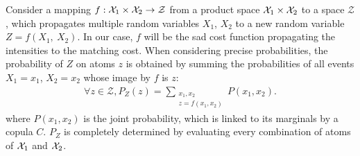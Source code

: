 Consider a mapping $f:\mathcal{X}_1\times\mathcal{X}_2\rightarrow\mathcal{Z}$ from a product space $\mathcal{X}_1\times\mathcal{X}_2$ to a space $\mathcal{Z}$, which propagates multiple random variables $X_1$, $X_2$ to a new random variable $Z=f(X_1, ~X_2)$. In our case, $f$ will be the \acrshort{sad} cost function propagating the intensities to the matching cost. When considering precise probabilities, the probability of $Z$ on atoms $z$ is obtained by summing the probabilities of all events $X_1=x_1$, $X_2=x_2$ whose image by $f$ is $z$: 
\begin{align}\label{eq:precise_propagate_proba}
    \forall z\in\mathcal{Z}, P_Z(z)=\sum_{\substack{x_1,x_2\\z=f(x_1,x_2)}}P(x_1,x_2).
\end{align}
where $P(x_1,x_2)$ is the joint probability, which is linked to its marginals by a copula $C$. $P_Z$ is completely determined by evaluating every combination of atoms of $\mathcal{X}_1$ and $\mathcal{X}_2$.

